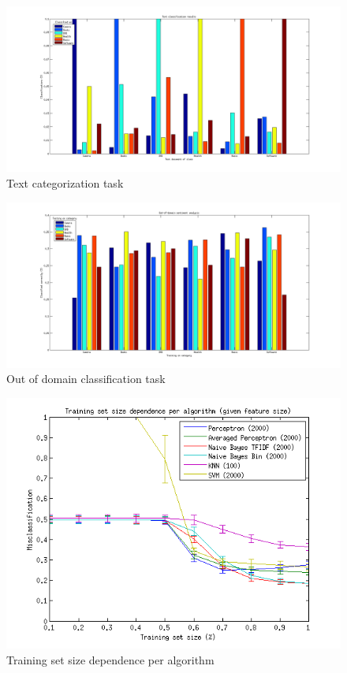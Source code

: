 \begin{figure}[H]
\centering
\includegraphics[scale = 0.3]{../Plottar/text_categorization.png}
\caption{Text categorization task}
\label{fig:trainingsize}
\end{figure} 

\begin{figure}[H]
\centering
\includegraphics[scale = 0.3]{../Plottar/outofdomain.png}
\caption{Out of domain classification task}
\label{fig:trainingsize}
\end{figure} 



\begin{figure}[H]
\centering
\includegraphics[scale = 0.8]{../Plottar/training_size_k_2000allknn_100.png}
\caption{Training set size dependence per algorithm}
\label{fig:trainingsize}
\end{figure} 

